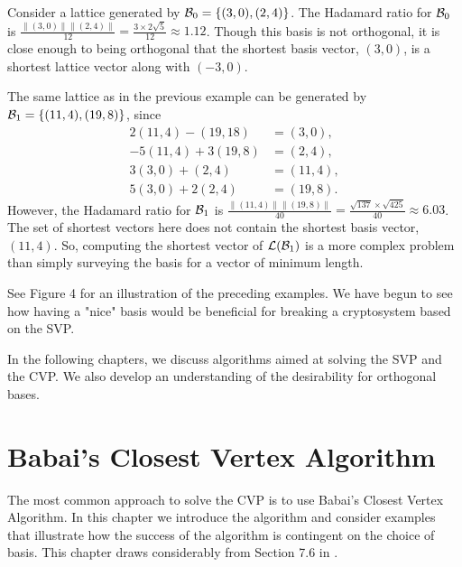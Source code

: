 \documentclass[a4paper,12pt]{article}
\begin{document}
\begin{ex}
    Consider a lattice generated by $\mathcal{B}_0 = \lbrace (3,0), (2,4) \rbrace$. The Hadamard ratio for $\mathcal{B}_0$ is $\frac{\|(3,0)\|\|(2,4)\|}{12} = \frac{3 \times 2\sqrt{5}}{12} \approx 1.12$. Though this basis is not orthogonal, it is close enough to being orthogonal that the shortest basis vector, $(3,0)$, is a shortest lattice vector along with $(-3,0)$.
\end{ex}
\begin{ex}
    The same lattice as in the previous example can be generated by $\mathcal{B}_1 = \lbrace (11,4), (19,8) \rbrace$, since
    \begin{align*}
       2(11,4) - (19,18) &= (3,0), \\ -5(11,4) + 3(19,8) &= (2,4), \\ 3(3,0) + (2,4) &= (11,4), \\ 5(3,0) + 2(2,4) &= (19,8). 
    \end{align*}
However, the  Hadamard ratio for $\mathcal{B}_1$ is $\frac{\|(11,4)\|\|(19,8)\|}{40} = \frac{\sqrt{137}\times\sqrt{425}}{40} \approx 6.03$. The set of shortest vectors here does not contain the shortest basis vector, $(11,4)$. So, computing the shortest vector of $\mathcal{L}(\mathcal{B}_1)$ is a more complex problem than simply surveying the basis for a vector of minimum length.
\end{ex}

 See Figure 4 for an illustration of the preceding examples. We have begun to see how having a "nice" basis would be beneficial for breaking a cryptosystem based on the SVP. 

In the following chapters, we discuss algorithms aimed at solving the SVP and the CVP. We also develop an understanding of the desirability for orthogonal bases.

\newpage

\section{Babai's Closest Vertex Algorithm}\label{Babai}

The most common approach to solve the CVP is to use Babai's Closest Vertex Algorithm. In this chapter we introduce the algorithm and consider examples that illustrate how the success of the algorithm is contingent on the choice of basis. This chapter draws considerably from Section 7.6 in \cite{HPS}.
\end{document}
